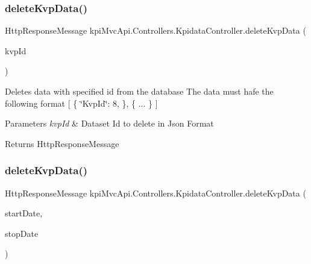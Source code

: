 \subsubsection{\texorpdfstring{delete\+Kvp\+Data()}{deleteKvpData()}\hspace{0.1cm}{\footnotesize\ttfamily [2/3]}}
{\footnotesize\ttfamily Http\+Response\+Message kpi\+Mvc\+Api.\+Controllers.\+Kpidata\+Controller.\+delete\+Kvp\+Data (\begin{DoxyParamCaption}\item[{List$<$ \hyperlink{classkpi_mvc_api_1_1_data_transfer_objects_1_1_kvp_data_dto}{Kvp\+Data\+Dto} $>$}]{kvp\+Id }\end{DoxyParamCaption})\hspace{0.3cm}{\ttfamily [inline]}}



Deletes data with specified id from the database The data must hafe the following format \mbox{[} \{ \char`\"{}\+Kvp\+Id\char`\"{}\+: 8, \}, \{ ... \} \mbox{]} 


\begin{DoxyParams}{Parameters}
{\em kvp\+Id} & Dataset Id to delete in Json Format \\
\hline
\end{DoxyParams}
\begin{DoxyReturn}{Returns}
{\ttfamily Http\+Response\+Message} 
\end{DoxyReturn}
\mbox{\label{classkpi_mvc_api_1_1_controllers_1_1_kpidata_controller_a39dbc332ddee57f0a7bda5d724a0d694}} 
\subsubsection{\texorpdfstring{delete\+Kvp\+Data()}{deleteKvpData()}\hspace{0.1cm}{\footnotesize\ttfamily [3/3]}}
{\footnotesize\ttfamily Http\+Response\+Message kpi\+Mvc\+Api.\+Controllers.\+Kpidata\+Controller.\+delete\+Kvp\+Data (\begin{DoxyParamCaption}\item[{string}]{start\+Date,  }\item[{string}]{stop\+Date }\end{DoxyParamCaption})\hspace{0.3cm}{\ttfamily [inline]}}



